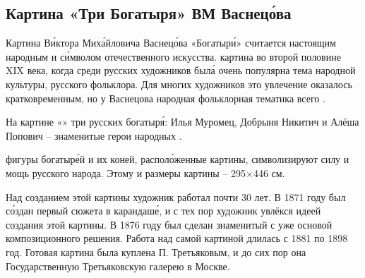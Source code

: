 \subsection{Картина «Три Богатыря» ВМ Васнец\'{о}ва}

Картина В\'{и}ктора Мих\'{а}йловича Васнец\'{о}ва «Богатыр\'{и}»  считается настоящим народным  и с\'{и}мволом отечественного искусства.  картина во второй половине XIX века, когда среди русских художников был\'{а} очень популярна тема народной культуры, русского фольклора. Для многих художников это увлечение оказалось кратковременным, но у Васнецова народная фольклорная тематика   всего .

На картине «»  три русских богатыр\'{я}: Илья Муромец, Добрыня Никитич и Алёша Попович -- знаменитые герои народных .

 фигуры богатыр\'{е}й и их коней, распол\'{о}женные  картины, символизируют силу и мощь русского народа. Этому   и  размеры картины -- 295$\times$446 см.

Над созданием этой картины художник работал почти 30 лет. В 1871 году был с\'{о}здан первый  сюжета в карандаш\'{е}, и с тех пор художник увлёкся идеей создания этой картины. В 1876 году был сделан знаменитый  с уже  основой композиционного решения. Работа над самой картиной длилась с 1881 по 1898 год. Готовая картина была куплена П. Третьяковым, и до сих пор она  Государственную Третьяковскую галерею в Москве.

